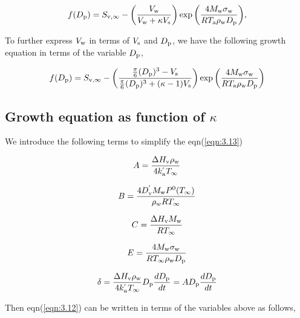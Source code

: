 \documentclass[12pt]{article}
\begin{document}
\begin{equation}\label{eqn:5.1}
f(D_{\rm p})=S_{\rm v, \infty}-\left(\frac{V_{\rm w}}{V_{\rm w} + \kappa V_{\rm s}}\right)\exp{\left(\frac{4 M_{\rm w} \sigma_{\rm w}}{R T_{\rm a} \rho_{\rm w} D_{\rm p}}\right)},
\end{equation}

To further express $V_{\rm w}$ in terms of $V_{\rm s}$ and $ D_{\rm p}$, we have the following growth equation in terms of the variable $D_{\rm p}$,

\begin{equation}\label{eqn:5.2}
f(D_{\rm p})=S_{\rm v, \infty}-\left(\frac{\frac{\pi}{6}(D_{\rm p})^{3}-V_{\rm s}} {\frac{\pi}{6}(D_{\rm p})^{3}+(\kappa-1)V_{\rm s}}\right)
\exp{\left(\frac{4 M_{\rm w} \sigma_{\rm w}}{R T_{\rm a} \rho_{\rm w} D_{\rm p}}\right)}
\end{equation}

\subsection{Growth equation as function of $\kappa$}

We introduce the following terms to simplify the eqn(\ref{eqn:3.13})

\begin{equation}\label{eqn:5.3}
A=\frac{\Delta H_{\rm v} \rho_{\rm w}}{4 k_{\rm a}^{'} T_{\infty}}
\end{equation}

\begin{equation}\label{eqn:5.4}
B=\frac{4 D_{\rm v}^{'} M_{\rm w} P^{\rm 0}(T_{\infty})}{\rho_w R T_{\infty}}
\end{equation}

\begin{equation}\label{eqn:5.5}
C=\frac{\Delta H_{\rm v} M_{\rm w}}{R T_{\infty}}
\end{equation}

\begin{equation}\label{eqn:5.6}
E=\frac{4 M_{\rm w}\sigma_{\rm w}}{R T_{\infty} \rho_{\rm w} D_{\rm p}}
\end{equation}

\begin{equation}\label{eqn:5.7}
\delta=\frac{\Delta H_{\rm v} \rho_{\rm w}}{4 k_a^{'} T_{\infty}} D_{\rm p} \frac{d D_{\rm p}}{dt}=A D_{\rm p} \frac{d D_{\rm p}}{dt}
\end{equation}

Then eqn(\ref{eqn:3.12}) can be written in terms of the variables above as follows,
\end{document}
